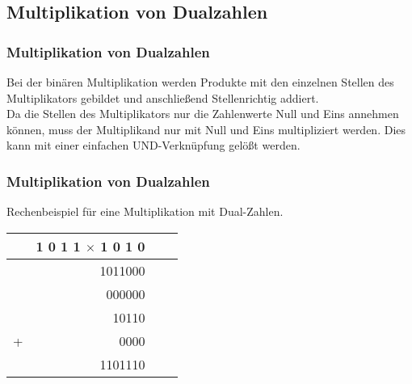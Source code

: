 \documentclass{beamer}
\begin{document}
\subsection{Multiplikation von Dualzahlen}
\begin{frame} 		
	\frametitle{Multiplikation von Dualzahlen}
	Bei der binären Multiplikation werden Produkte mit den einzelnen Stellen des Multiplikators gebildet und anschließend
	Stellenrichtig addiert. \\
	Da die Stellen des Multiplikators nur die Zahlenwerte Null und Eins annehmen können, muss der 
	Multiplikand nur mit Null und Eins multipliziert werden. Dies kann mit einer einfachen UND-Verknüpfung gelößt werden.
\end{frame}


\begin{frame} 		
	\frametitle{Multiplikation von Dualzahlen}
	Rechenbeispiel für eine Multiplikation mit Dual-Zahlen.
	\begin{center}
		\begin{tabular}{crcl}
				&		 	       	  1 0 1 1 $\times$ 1 0 1 0	 	  	\\ \hline
				&							1011000			\\
				&							000000			\\
				&							10110			\\
		 +		&							0000			  	\\ \hline
				&						        1101110		  
		\end{tabular}
	\end{center}
\end{frame}
\end{document}
